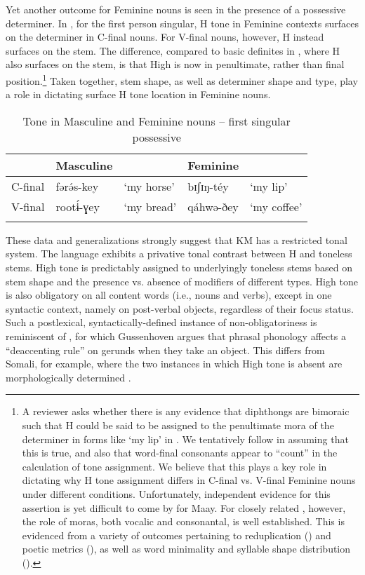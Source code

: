 \documentclass[output=paper,colorlinks,citecolor=brown]{langscibook}
\begin{document}
Yet another outcome for Feminine nouns is seen in the presence of a  possessive determiner. In , for the first person singular, H tone in Feminine contexts surfaces on the determiner in C-final nouns. For V-final nouns, however, H instead surfaces on the stem. The difference, compared to basic definites in , where H also surfaces on the stem, is that High is now in penultimate, rather than final position.\footnote{A reviewer asks whether there is any evidence that diphthongs are bimoraic such that H could be said to be assigned to the penultimate mora of the determiner in forms like `my lip' in . We tentatively follow \citet{Smith2022} in assuming that this is true, and also that word-final consonants appear to ``count'' in the calculation of tone assignment. We believe that this plays a key role in dictating why H tone assignment differs in C-final vs. V-final Feminine nouns under different conditions. Unfortunately, independent evidence for this assertion is yet difficult to come by for Maay. For closely related , however, the role of moras, both vocalic and consonantal, is well established. This is evidenced from a variety of outcomes pertaining to reduplication (\citealt{Orwin1996}) and poetic metrics (\citealt{Orwin2001}), as well as word minimality and syllable shape distribution (\citealt{Green2022}).} Taken together, stem shape, as well as determiner shape and type, play a role in dictating surface H tone location in Feminine nouns. 

\begin{table}
\caption{Tone in Masculine and Feminine nouns -- first singular possessive}
\label{tab:MFPosssesive}
 \begin{tabular}{lllll}
  \lsptoprule
  &      Masculine  &  & Feminine &  \\
  \midrule
C-final & fərə́s-key & `my horse' & bɪʃɪŋ-téy & `my lip' \\
V-final & rootɨ́-ɣey & `my bread' & qáhwə-ðey & `my coffee' \\
  \lspbottomrule
 \end{tabular}
\end{table}

These data and generalizations strongly suggest that KM has a restricted tonal system. The language exhibits a privative tonal contrast between H and toneless stems. High tone is predictably assigned to underlyingly toneless stems based on stem shape and the presence vs. absence of modifiers of different types. High tone is also obligatory  on all content words (i.e., nouns and verbs), except in one syntactic context, namely on post-verbal objects, regardless of their focus status. Such a postlexical, syntactically-defined instance of non-obligatoriness is reminiscent of , for which Gussenhoven \citeyearpar{Gussenhoven2006} argues that phrasal phonology affects a ``deaccenting rule'' on gerunds when they take an object. This differs from Somali, for example, where the two instances in which High tone is absent are morphologically determined \citep{GreenLampitelli2022,hyman81}.
\end{document}
